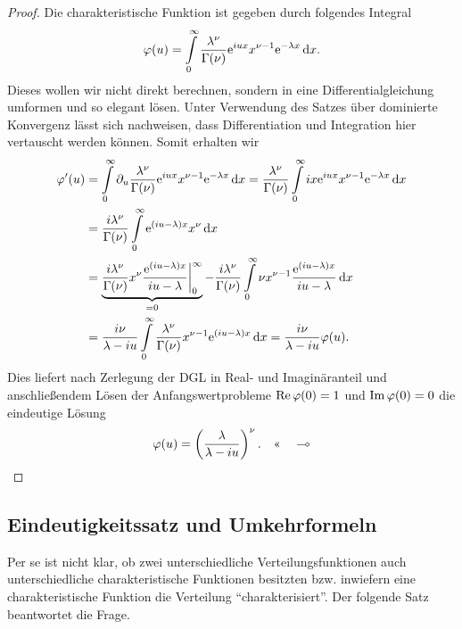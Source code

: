 \begin{bem}
\begin{proof}
Die charakteristische Funktion ist gegeben durch folgendes Integral
\begin{align*}
\varphi(u) = \int\limits_0^\infty
\frac{\lambda^\nu}{\Gamma(\nu)}\mathrm{e}^{iux}x^{\nu-1}\mathrm{e}^{-\lambda x}\,\mathrm{d} x.
\end{align*}
Dieses wollen wir nicht direkt berechnen, sondern in eine Differentialgleichung
umformen und so elegant lösen. Unter Verwendung des Satzes über dominierte
Konvergenz lässt sich nachweisen, dass  Differentiation
und Integration hier vertauscht werden können. Somit erhalten wir
\begin{align*}
\varphi'(u) &= \int\limits_0^\infty \partial_u
\frac{\lambda^\nu}{\Gamma(\nu)}\mathrm{e}^{iux}x^{\nu-1}\mathrm{e}^{-\lambda x}\,\mathrm{d} x
= \frac{\lambda^\nu}{\Gamma(\nu)}
 \int\limits_0^\infty
ix \mathrm{e}^{iux}x^{\nu-1}\mathrm{e}^{-\lambda x}\,\mathrm{d} x\\
&=
\frac{i\lambda^\nu}{\Gamma(\nu)}
 \int\limits_0^\infty
\mathrm{e}^{(iu-\lambda)x}x^{\nu}\,\mathrm{d} x\\
&=
 \underbrace{\frac{i\lambda^\nu}{\Gamma(\nu)}
x^\nu\frac{\mathrm{e}^{(iu-\lambda)x}}{iu-\lambda}\bigg|_0^\infty}_{=0}
- \frac{i\lambda^\nu}{\Gamma(\nu)}
 \int\limits_0^\infty
\nu x^{\nu-1}\frac{\mathrm{e}^{(iu-\lambda)x}}{iu-\lambda}\,\mathrm{d} x\\
&=
\frac{i\nu}{\lambda-iu}
 \int\limits_0^\infty
 \frac{\lambda^\nu}{\Gamma(\nu)}
x^{\nu-1}\mathrm{e}^{(iu-\lambda)x}\,\mathrm{d} x
=
 \frac{i\nu}{\lambda-iu}\varphi(u).
\end{align*}
Dies liefert nach Zerlegung der DGL in Real- und Imaginäranteil und
anschließendem Lösen der Anfangswertprobleme $\operatorname{Re}\varphi(0) = 1$ und $\operatorname{Im}\varphi(0) =
0$ die eindeutige Lösung
\begin{align*}
\varphi(u) = \left(\frac{\lambda}{\lambda-iu}\right)^\nu.\quad\text{<<}\quad\multimap
\end{align*}
\end{proof}
\end{bem}

\subsection{Eindeutigkeitssatz und Umkehrformeln}

Per se ist nicht klar, ob zwei unterschiedliche Verteilungsfunktionen auch
unterschiedliche charakteristische Funktionen besitzten bzw. inwiefern
eine charakteristische Funktion die Verteilung ``charakterisiert''. Der folgende
Satz beantwortet die Frage.

